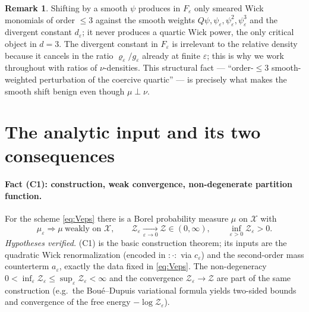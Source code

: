 \documentclass[12pt]{article}
\newcommand{\Wick}[1]{{:}#1{:}}
\newcommand{\eps}{\varepsilon}
\theoremstyle{plain}
\theoremstyle{definition}
\newtheorem{remark}{Remark}
\begin{document}
\begin{remark}\label{rem:why}
Shifting by a smooth $\psi$ produces in $F_\eps$ only smeared Wick monomials of order
$\le3$ against the smooth weights $Q\psi,\psi_\eps,\psi_\eps^2,\psi_\eps^3$ and the
divergent constant $d_\eps$; it never produces a quartic Wick power, the only critical
object in $d=3$. The divergent constant in $F_\eps$ is irrelevant to the relative
density because it cancels in the ratio $\varrho_\eps/g_\eps$ already at finite $\eps$;
this is why we work throughout with ratios of $\nu$-densities. This structural fact ---
``order-$\le3$ smooth-weighted perturbation of the coercive quartic'' --- is precisely
what makes the smooth shift benign even though $\mu\perp\nu$.
\end{remark}

\section{The analytic input and its two consequences}\label{sec:input}

\paragraph{Fact (C1): construction, weak convergence, non-degenerate partition
function.} For the scheme \eqref{eq:Veps} there is a Borel probability measure $\mu$ on
$\mathcal X$ with
\begin{equation}\label{eq:C1}
\mu_\eps\Rightarrow\mu\ \text{weakly on }\mathcal X,
\qquad
\mathcal Z_\eps\xrightarrow[\eps\to0]{}\mathcal Z\in(0,\infty),\qquad
\inf_{\eps>0}\mathcal Z_\eps>0 .
\end{equation}
\emph{Hypotheses verified.} (C1) is the basic construction theorem; its inputs are the
quadratic Wick renormalization (encoded in $\Wick{\cdot}$ via $c_\eps$) and the
second-order mass counterterm $a_\eps$, exactly the data fixed in \eqref{eq:Veps}. The
non-degeneracy $0<\inf_\eps\mathcal Z_\eps\le\sup_\eps\mathcal Z_\eps<\infty$ and the
convergence $\mathcal Z_\eps\to\mathcal Z$ are part of the same construction (e.g.\ the
Bou\'e--Dupuis variational formula yields two-sided bounds and convergence of the free
energy $-\log\mathcal Z_\eps$).
\end{document}

